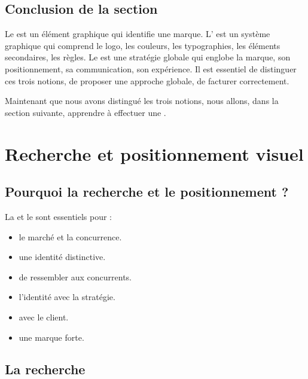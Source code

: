 \subsection*{Conclusion de la section}

Le  est un élément graphique qui identifie une marque. L' est un système graphique qui comprend le logo, les couleurs, les typographies, les éléments secondaires, les règles. Le  est une stratégie globale qui englobe la marque, son positionnement, sa communication, son expérience. Il est essentiel de distinguer ces trois notions, de proposer une approche globale, de facturer correctement.

Maintenant que nous avons distingué les trois notions, nous allons, dans la section suivante, apprendre à effectuer une .

\section{Recherche et positionnement visuel}

\subsection{Pourquoi la recherche et le positionnement ?}

La  et le  sont essentiels pour :

\begin{itemize}
    \item {} le marché et la concurrence.
    \item {} une identité distinctive.
    \item {} de ressembler aux concurrents.
    \item {} l'identité avec la stratégie.
    \item {} avec le client.
    \item {} une marque forte.
\end{itemize}

\subsection{La recherche}

